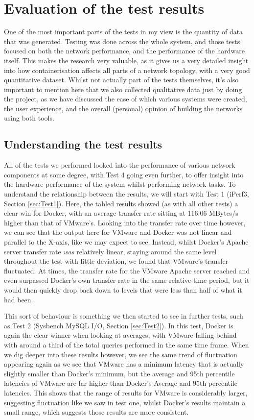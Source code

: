 \section{Evaluation of the test results}
\label{sec:EvaluationTestResults}
One of the most important parts of the tests in my view is the quantity of data that was generated. Testing was done across the whole system, and those tests focused on both the network performance, and the performance of the hardware itself. This makes the research very valuable, as it gives us a very detailed insight into how containerisation affects all parts of a network topology, with a very good quantitative dataset. Whilst not actually part of the tests themselves, it's also important to mention here that we also collected qualitative data just by doing the project, as we have discussed the ease of which various systems were created, the user experience, and the overall (personal) opinion of building the networks using both tools.

\subsection{Understanding the test results}
All of the tests we performed looked into the performance of various network components at some degree, with Test 4 going even further, to offer insight into the hardware performance of the system whilst performing network tasks. To understand the relationship between the results, we will start with Test 1 (iPerf3, Section \ref{sec:Test1}). Here, the tabled results showed (as with all other tests) a clear win for Docker, with an average transfer rate sitting at 116.06 MBytes/s higher than that of VMware's. Looking into the transfer rate over time however, we can see that the output here for VMware and Docker was not linear and parallel to the X-axis, like we may expect to see. Instead, whilst Docker's Apache server transfer rate \emph{was} relatively linear, staying around the same level throughout the test with little deviation, we found that VMware's transfer fluctuated. At times, the transfer rate for the VMware Apache server reached and even surpassed Docker's own transfer rate in the same relative time period, but it would then quickly drop back down to levels that were less than half of what it had been.

This sort of behaviour is something we then started to see in further tests, such as Test 2 (Sysbench MySQL I/O, Section \ref{sec:Test2}). In this test, Docker is again the clear winner when looking at averages, with VMware falling behind with around a third of the total queries performed in the same time frame. When we dig deeper into these results however, we see the same trend of fluctuation appearing again as we see that VMware has a minimum latency that is actually slightly smaller than Docker's minimum, but the average and 95th percentile latencies of VMware are far higher than Docker's Average and 95th percentile latencies. This shows that the range of results for VMware is considerably larger, suggesting fluctuation like we saw in test one, whilst Docker's results maintain a small range, which suggests those results are more consistent.

